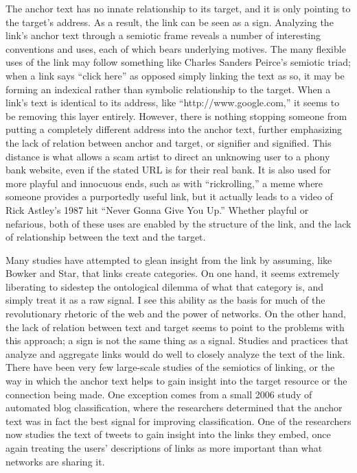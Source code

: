 The anchor text has no innate relationship to its target, and it is only pointing to the target’s address. As a result, the link can be seen as a sign. Analyzing the link’s anchor text through a semiotic frame reveals a number of interesting conventions and uses, each of which bears underlying motives. The many flexible uses of the link may follow something like Charles Sanders Peirce’s semiotic triad; when a link says “click here” as opposed simply linking the text as so, it may be forming an indexical rather than symbolic relationship to the target. When a link’s text is identical to its address, like “http://www.google.com,” it seems to be removing this layer entirely. However, there is nothing stopping someone from putting a completely different address into the anchor text, further emphasizing the lack of relation between anchor and target, or signifier and signified. This distance is what allows a scam artist to direct an unknowing user to a phony bank website, even if the stated URL is for their real bank. It is also used for more playful and innocuous ends, such as with “rickrolling,” a meme where someone provides a purportedly useful link, but it actually leads to a video of Rick Astley’s 1987 hit “Never Gonna Give You Up.” Whether playful or nefarious, both of these uses are enabled by the structure of the link, and the lack of relationship between the text and the target.

Many studies have attempted to glean insight from the link by assuming, like Bowker and Star, that links create categories. On one hand, it seems extremely liberating to sidestep the ontological dilemma of what that category is, and simply treat it as a raw signal. I see this ability as the basis for much of the revolutionary rhetoric of the web and the power of networks. On the other hand, the lack of relation between text and target seems to point to the problems with this approach; a sign is not the same thing as a signal. Studies and practices that analyze and aggregate links would do well to closely analyze the text of the link. There have been very few large-scale studies of the semiotics of linking, or the way in which the anchor text helps to gain insight into the target resource or the connection being made. One exception comes from a small 2006 study of automated blog classification, where the researchers determined that the anchor text was in fact the best signal for improving classification.  One of the researchers now studies the text of tweets to gain insight into the links they embed, once again treating the users’ descriptions of links as more important than what networks are sharing it.

